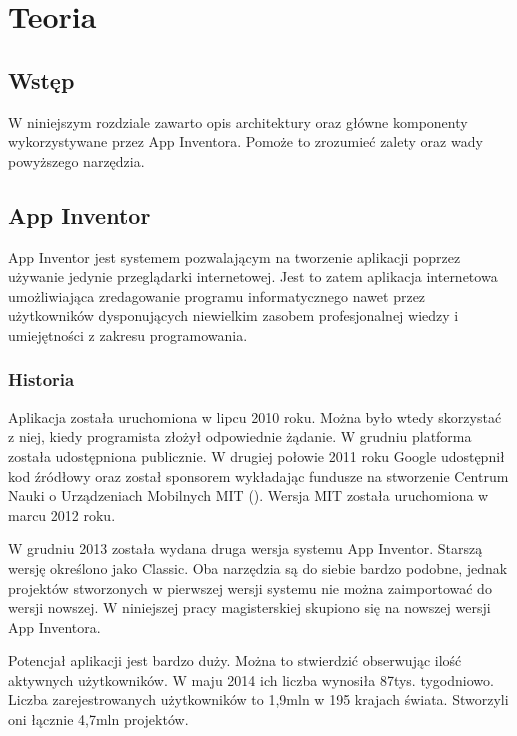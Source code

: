 \chapter{Teoria}
\label{c3}

\section{Wstęp}
\label{c31}

W niniejszym rozdziale zawarto opis architektury oraz główne komponenty wykorzystywane przez App Inventora. Pomoże to zrozumieć zalety oraz wady powyższego narzędzia.

\section{App Inventor}
\label{c21}

App Inventor jest systemem pozwalającym na tworzenie aplikacji poprzez używanie jedynie przeglądarki internetowej. Jest to zatem aplikacja internetowa umożliwiająca zredagowanie programu informatycznego nawet przez użytkowników dysponujących niewielkim zasobem profesjonalnej  wiedzy i umiejętności z zakresu programowania.  

\subsection{Historia}

Aplikacja została uruchomiona w lipcu 2010 roku. Można było wtedy skorzystać z niej, kiedy programista złożył odpowiednie żądanie. W grudniu platforma została udostępniona publicznie. W drugiej połowie 2011 roku Google udostępnił kod źródłowy oraz został sponsorem wykładając fundusze na  stworzenie Centrum Nauki o Urządzeniach Mobilnych MIT (). Wersja MIT została uruchomiona w marcu 2012 roku.\cite{android:39}

W grudniu 2013 została wydana druga wersja systemu App Inventor. Starszą wersję określono jako Classic. Oba narzędzia są do siebie bardzo podobne, jednak projektów stworzonych w pierwszej wersji systemu nie można zaimportować do wersji nowszej. W niniejszej pracy magisterskiej skupiono się na nowszej wersji App Inventora. 

Potencjał aplikacji jest bardzo duży. Można to stwierdzić obserwując ilość aktywnych użytkowników. W maju 2014 ich liczba wynosiła 87tys. tygodniowo. Liczba zarejestrowanych użytkowników to 1,9mln w 195 krajach świata. Stworzyli oni łącznie 4,7mln projektów.\cite{article:appinventor1}

